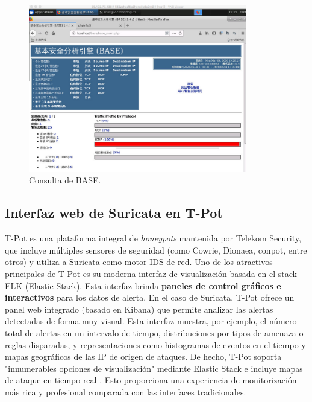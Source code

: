 \documentclass[11pt,a4paper,twoside]{report}
\begin{document}
\begin{figure}[hbtp]
	\centering
	\includegraphics[width=0.85\textwidth]{documento/2.png}
	\caption{Consulta de BASE.}
	\label{fig:base-stats}
\end{figure}

\subsection{Interfaz web de Suricata en T-Pot}
T-Pot es una plataforma integral de \emph{honeypots} mantenida por Telekom Security, que incluye múltiples sensores de seguridad (como Cowrie, Dionaea, conpot, entre otros) y utiliza a Suricata como motor IDS de red. Uno de los atractivos principales de T-Pot es su moderna interfaz de visualización basada en el stack ELK (Elastic Stack). Esta interfaz brinda \textbf{paneles de control gráficos e interactivos} para los datos de alerta. En el caso de Suricata, T-Pot ofrece un panel web integrado (basado en Kibana) que permite analizar las alertas detectadas de forma muy visual. Esta interfaz muestra, por ejemplo, el número total de alertas en un intervalo de tiempo, distribuciones por tipos de amenaza o reglas disparadas, y representaciones como histogramas de eventos en el tiempo y mapas geográficos de las IP de origen de ataques. De hecho, T-Pot soporta "innumerables opciones de visualización" mediante Elastic Stack e incluye mapas de ataque en tiempo real \cite{tpot}. Esto proporciona una experiencia de monitorización más rica y profesional comparada con las interfaces tradicionales.\newline
\end{document}
